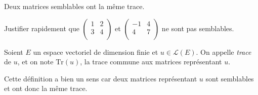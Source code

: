 \documentclass[a4paper,10pt]{report}
\begin{document}
\begin{preuve} 

\vspace{7cm}
\end{preuve}

\begin{cor} Deux matrices semblables ont la même trace.
\end{cor}

\begin{preuve} 
\vspace{3cm}
\end{preuve}


\begin{exa} Justifier rapidement que $\begin{pmatrix}
1 & 2 \\
3 & 4 \\
\end{pmatrix}$ et $\begin{pmatrix}
-1 & 4 \\
4 & 7 \\
\end{pmatrix}$ ne sont pas semblables.
\end{exa}



\begin{defip} Soient $E$ un espace vectoriel de dimension finie et $u \in \mathcal{L}(E)$. On appelle \textit{trace} de $u$, et on note $\textrm{Tr}(u)$, la trace commune aux matrices représentant $u$.
\end{defip}

\begin{preuve} Cette définition a bien un sens car deux matrices représentant $u$ sont semblables et ont donc la même trace.
\end{preuve}
\end{document}
